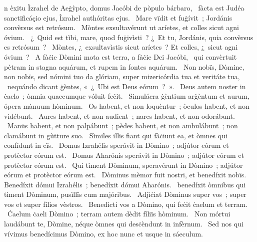 { }
{%
n èxitu Ìzrahel de Aeġỳpto, domus Jacóbi de pòpulo bárbaro, 
~fàcta est Judéa sanctificáçio ejus, Ìzrahel authóritas ejus. 
~Mare vïdit et fuġívit~; Jordánis convèrsus est retrósum. 
~Mòntes exsultavérunt ut aríetes, et colles sicut agni óvium. 
~¿~Quid est tìbi, mare, quod fuġivìsti~? ¿~Et tu, Jordánis, quia convèrsus es retrósum~? 
~Mòntes, ¿~exsultavìstis sicut aríetes~? Et colles, ¿~sicut agni óvium~? 
~A fàċie Dòmini mota est terra, a fàċie Dei Jacóbi, 
~qui convèrtuit pètram in stagna aquárum, et rupem in fontes aquárum. 
~Non nobïs, Dòmine, non nobïs, sed nómini tuo da glóriam, super mizericórdia tua et veritáte tua, 
~nequándo dicant ġèntes, «~¿~Ubi est Deus eórum~?~». 
~Deus autem noster in ċaelo~; òmnia quaecumque vóluit feċit. 
~Simulácra ġèntium arġèntum et aurum, ópera mànuum hòminum. 
~Os habent, et non loquèntur~; òculos habent, et non vidébunt. 
~Aures habent, et non audient~; nares habent, et non odorábunt. 
~Manüs habent, et non palpábunt~; pèdes habent, et non ambulábunt~; non clamábunt in gùtture suo. 
~Sìmiles illïs fiant qui fàċiunt ea, et òmnes qui confídunt in eïs. 
~Domus Izrahélis sperávit in Dòmino~; adjútor eórum et protèctor eórum est. 
~Domus Aharónis sperávit in Dòmino~; adjútor eórum et protèctor eórum est. 
~Qui tìment Dòminum, speravérunt in Dòmino~; adjútor eórum et protèctor eórum est. 
~Dòminus mèmor fuit nostri, et benedíxit nobïs. Benedíxit dómui Izrahélis~; benedíxit dómui Aharónis. 
~benedíxit òmnibus qui tìment Dòminum, pusìllïs cum majóribus. 
~Adjìċiat Dòminus super vos~; super vos et super fílios vèstros. 
~Benedìcti vos a Dòmino, qui feċit ċaelum et terram. 
~Ċaelum ċaeli Dòmino~; terram autem dèdit fíliïs hòminum. 
~Non mórtui laudábunt te, Dòmine, néque òmnes qui desċèndunt in infèrnum. 
~Sed nos qui vívimus benedícimus Dòmino, ex hoc nunc et usque in sáeculum. 
}
